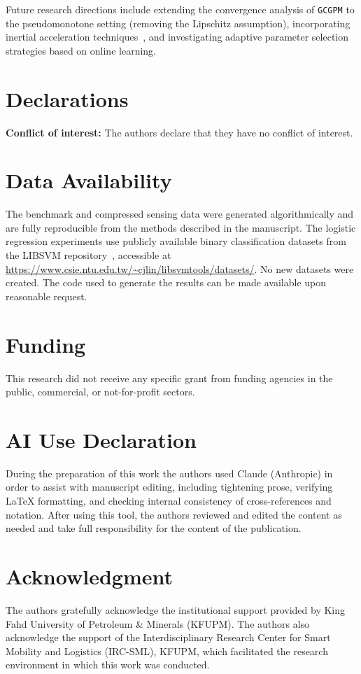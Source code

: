 \documentclass{article}
\theoremstyle{plain}
\theoremstyle{definition}
\theoremstyle{remark}
\newcommand{\algoname}[1]{{\small\texttt{#1}}}
\newcommand{\GCGPM}{\algoname{GCGPM}}
\begin{document}
Future research directions include extending the convergence analysis of \GCGPM{} to the pseudomonotone setting (removing the Lipschitz assumption), incorporating inertial acceleration techniques~\cite{jian2022inertial}, and investigating adaptive parameter selection strategies based on online learning.

\section*{Declarations}

\textbf{Conflict of interest:} The authors declare that they have no conflict of interest.

\section*{Data Availability}
The benchmark and compressed sensing data were generated algorithmically and are fully reproducible from the methods described in the manuscript. The logistic regression experiments use publicly available binary classification datasets from the LIBSVM repository~\cite{chang2011libsvm}, accessible at \url{https://www.csie.ntu.edu.tw/~cjlin/libsvmtools/datasets/}. No new datasets were created. The code used to generate the results can be made available upon reasonable request.

\section*{Funding}
This research did not receive any specific grant from funding agencies in the public, commercial, or not-for-profit sectors.

\section*{AI Use Declaration}
During the preparation of this work the authors used Claude (Anthropic) in order to assist with manuscript editing, including tightening prose, verifying LaTeX formatting, and checking internal consistency of cross-references and notation. After using this tool, the authors reviewed and edited the content as needed and take full responsibility for the content of the publication.

\section*{Acknowledgment}
The authors gratefully acknowledge the institutional support provided by King Fahd University of Petroleum \& Minerals (KFUPM). The authors also acknowledge the support of the Interdisciplinary Research Center for Smart Mobility and Logistics (IRC-SML), KFUPM, which facilitated the research environment in which this work was conducted.




\printbibliography
\end{document}
